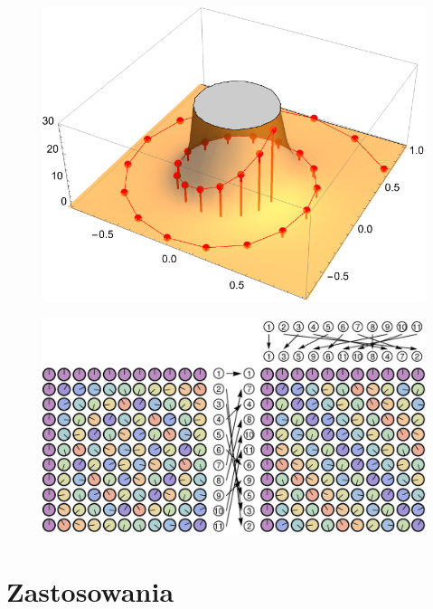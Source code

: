 \documentclass[polish, titlepage, 12pt]{article}
\begin{document}
\begin{figure}[htbp]
    \begin{adjustbox}{center}
        \begin{minipage}[t][][b]{0.6\textwidth}
            \centering
            \includegraphics[width=0.8\linewidth]{img/chirp-z.png}
            \label{fig:chirp-z}
        \end{minipage}%
        \begin{minipage}[t][][b]{0.6\textwidth}
            \centering
            \includegraphics[width=0.8\linewidth]{img/rader.jpg}
            \label{fig:rader}
        \end{minipage}
    \end{adjustbox}
\end{figure}



\section{Zastosowania}

\end{document}
